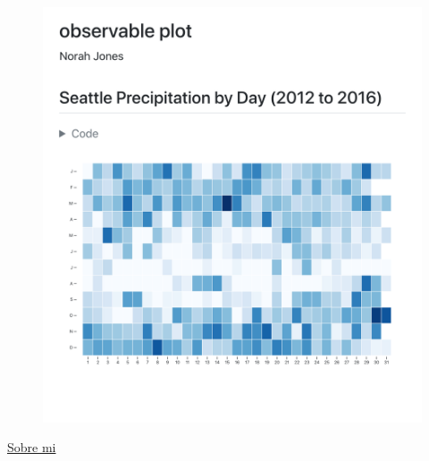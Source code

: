 \documentclass[
  letterpaper,
]{article}
\begin{document}
\begin{figure}

{\centering \includegraphics{images/hello-observable.png}

}

\end{figure}

\href{docs/get-started/index.html}{Sobre mi}


\printbibliography
\end{document}
